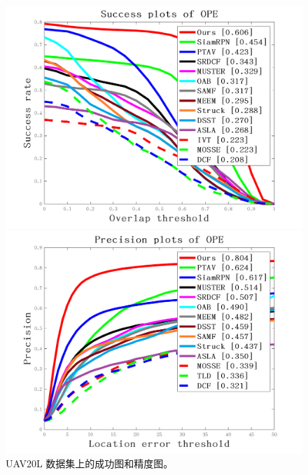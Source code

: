 \begin{figure}[t]
\begin{minipage}[b]{0.5\textwidth}
  \centering
  \centerline{\includegraphics[width=1.0\textwidth]{Img/end/quality_plot_overlap_OPE_AUC.png}}
\end{minipage}
\hfill
\begin{minipage}[b]{0.5\textwidth}
  \centering
  \centerline{\includegraphics[width=1.0\textwidth]{Img/end/quality_plot_error_OPE_threshold.png}}
\end{minipage}
\caption{UAV20L 数据集上的成功图和精度图。}
\label{fig:uav20l}
\end{figure}
